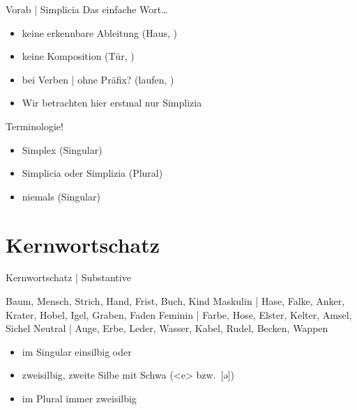 \begin{frame}
  {Vorab | Simplicia}
  \onslide<+->
  \onslide<+->
  Das \alert{einfache} Wort…\\
  \Halbzeile
  \begin{itemize}[<+->]
    \item keine erkennbare Ableitung (\alert{Haus}, )
    \item keine Komposition (\alert{Tür}, )
    \item bei Verben | ohne Präfix? (\alert{laufen}, )
      \Halbzeile
    \item \alert{Wir betrachten hier erstmal nur Simplizia}
  \end{itemize}
      \Zeile
   Terminologie!\\
  \Halbzeile
  \begin{itemize}[<+->]
    \item \alert{Simplex} (Singular)
    \item \alert{Simplicia} oder \alert{Simplizia} (Plural)
      \Halbzeile
    \item niemals  (Singular)
  \end{itemize}
\end{frame}

\section{Kernwortschatz}

\begin{frame}
  {Kernwortschatz | Substantive}
  \onslide<+->
  \onslide<+->
  \begin{exe}
    \ex Baum, Mensch, Strich, Hand, Frist, Buch, Kind
    \Halbzeile
    \onslide<+->
    \ex \alert{Maskulin} | Hase, Falke, Anker, Krater, Hobel, Igel, Graben, Faden
    \onslide<+->
    \ex \alert{Feminin} | Farbe, Hose, Elster, Kelter, Amsel, Sichel
    \onslide<+->
    \ex \alert{Neutral} | Auge, Erbe, Leder, Wasser, Kabel, Rudel, Becken, Wappen
  \end{exe}
  \onslide<+->
  \Zeile
  \begin{itemize}[<+->]
    \item im Singular einsilbig oder
    \item zweisilbig, zweite Silbe mit \alert{Schwa} (<e> bzw.\ [ə])
    \item im Plural immer zweisilbig
  \end{itemize}
\end{frame}

